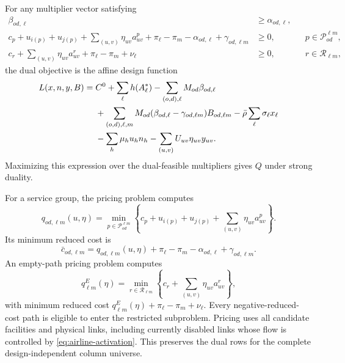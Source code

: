 \documentclass[final,3p,authoryear]{elsarticle}
\begin{document}
For any multiplier vector satisfying
\begin{align}
 \beta_{od,\ell}&\ge\alpha_{od,\ell},\label{eq:dual-w}\\
 c_p+u_{i(p)}+u_{j(p)}+\sum_{(u,v)}\eta_{uv}a_{uv}^p
 +\pi_\ell-\pi_m-\alpha_{od,\ell}+\gamma_{od,\ell m}&\ge0,
 &&p\in\mathcal P_{od}^{\ell m},\label{eq:dual-service}\\
 c_r+\sum_{(u,v)}\eta_{uv}a_{uv}^r+\pi_\ell-\pi_m+\nu_\ell&\ge0,
 &&r\in\mathcal R_{\ell m},\label{eq:dual-empty}
\end{align}
the dual objective is the affine design function
\begin{align}
 L(x,n,y,B)={}&C^0+\sum_\ell h(A_\ell^*)
 -\sum_{(o,d),\ell}M_{od}\beta_{od,\ell}\notag\\
 &+\sum_{(o,d),\ell,m}M_{od}
  (\beta_{od,\ell}-\gamma_{od,\ell m})B_{od,\ell m}
 -\bar\rho\sum_\ell\sigma_\ell x_\ell\notag\\
 &-\sum_h\mu_hu_hn_h
 -\sum_{(u,v)}U_{uv}\eta_{uv}y_{uv}.
 \label{eq:global-cut}
\end{align}
Maximizing this expression over the dual-feasible multipliers gives $Q$ under strong duality.



For a service group, the pricing problem computes
\begin{equation}
 q_{od,\ell m}(u,\eta)=
 \min_{p\in\mathcal P_{od}^{\ell m}}
 \left\{c_p+u_{i(p)}+u_{j(p)}+
       \sum_{(u,v)}\eta_{uv}a_{uv}^p\right\}.
 \label{eq:service-pricing}
\end{equation}
Its minimum reduced cost is
\begin{equation}
 \bar c_{od,\ell m}=q_{od,\ell m}(u,\eta)
 +\pi_\ell-\pi_m-\alpha_{od,\ell}+\gamma_{od,\ell m}.
 \label{eq:service-reduced-cost}
\end{equation}
An empty-path pricing problem computes
\begin{equation}
 q_{\ell m}^{E}(\eta)=\min_{r\in\mathcal R_{\ell m}}
 \left\{c_r+\sum_{(u,v)}\eta_{uv}a_{uv}^r\right\},
 \label{eq:empty-pricing}
\end{equation}
with minimum reduced cost $q_{\ell m}^{E}(\eta)+\pi_\ell-\pi_m+\nu_\ell$.
Every negative-reduced-cost path is eligible to enter the restricted subproblem.
Pricing uses all candidate facilities and physical links, including currently disabled links whose flow is controlled by \eqref{eq:airline-activation}.
This preserves the dual rows for the complete design-independent column universe.
\end{document}
